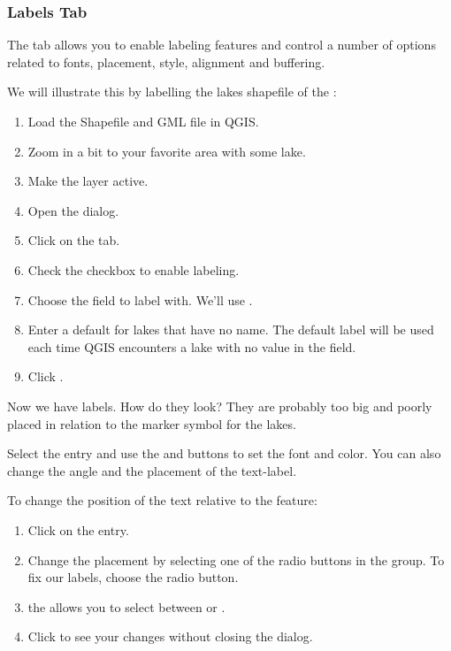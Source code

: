 \subsubsection{Labels Tab}

The  tab allows you to enable labeling features and control a number of
options related to fonts, placement, style, alignment and buffering.

We will illustrate this by labelling the lakes shapefile of the
:

\begin{enumerate}
\item Load the Shapefile  and GML file  in QGIS.
\item Zoom in a bit to your favorite area with some lake.
\item Make the  layer active.
\item Open the  dialog.
\item Click on the  tab.
\item Check the  checkbox to enable labeling.
\item Choose the field to label with. 
  We'll use .
\item Enter a default for lakes that have no name. The default label will be
  used each time QGIS encounters a lake with no value in the  field.
\item Click .
\end{enumerate} 

Now we have labels. How do they look? They are probably too big and poorly
placed in relation to the marker symbol for the lakes.

Select the  entry and use the  and 
buttons to set the font and color. You can also change the angle and the
placement of the text-label.

To change the position of the text relative to the feature:

\begin{enumerate} 
\item Click on the  entry.
\item Change the placement by selecting one of the radio buttons
in the  group. To fix our labels, choose the
 radio button.
\item the  allows you to select between
 or .
\item Click  to see your changes without closing the dialog.
\end{enumerate} 


